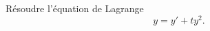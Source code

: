 

\begin{exercice}\label{exo_II-1-25}

Résoudre l'équation de Lagrange
\begin{equation}
	y=y'+ty^2.
\end{equation}

\end{exercice}
